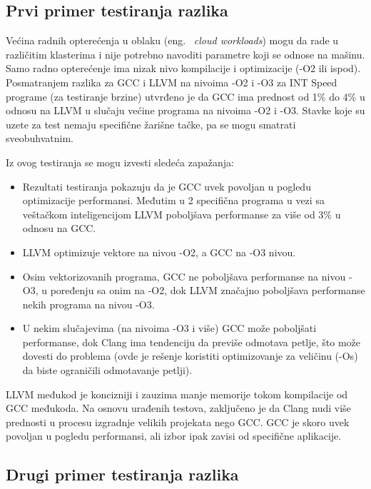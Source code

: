 \documentclass[a4paper]{article}
\begin{document}
\subsection{Prvi primer testiranja razlika}
\label{subsec:primer1}
Većina radnih opterećenja u oblaku (eng. ~{\em cloud workloads}) mogu da rade u različitim klasterima i nije potrebno navoditi parametre koji se odnose na mašinu. 
Samo radno opterećenje ima nizak nivo kompilacije i optimizacije (-O2 ili ispod).
Posmatranjem razlika za GCC i LLVM na nivoima -O2 i -O3 za INT Speed programe (za testiranje brzine) utvrđeno je da 
GCC ima prednost od 1\% do 4\% u odnosu na LLVM u slučaju većine programa na nivoima -O2 i -O3. 
Stavke koje su uzete za test nemaju specifične žarišne tačke, pa se mogu smatrati sveobuhvatnim.

Iz ovog testiranja se mogu izvesti sledeća zapažanja: 

\begin{itemize} 
\item Rezultati testiranja pokazuju da je GCC uvek povoljan u pogledu optimizacije performansi. 
Međutim u 2 specifična programa u vezi sa veštačkom inteligencijom LLVM poboljšava performanse za više od 3\% u odnosu na GCC. 
\item LLVM optimizuje vektore na nivou -O2,  a GCC na -O3 nivou. 
\item Osim vektorizovanih programa, GCC ne poboljšava performanse na nivou -O3, u poređenju sa onim na -O2, dok LLVM značajno poboljšava performanse nekih programa na nivou -O3. 
\item U nekim slučajevima (na nivoima -O3 i više) GCC može poboljšati performanse, dok Clang ima tendenciju da previše odmotava petlje, što može dovesti do problema (ovde je rešenje koristiti optimizovanje za veličinu (-Os) da biste ograničili odmotavanje petlji).
\end{itemize}

LLVM međukod je koncizniji i zauzima manje memorije tokom kompilacije od GCC međukoda.
Na osnovu urađenih testova, zaključeno je da Clang nudi više prednosti u procesu izgradnje velikih projekata nego GCC. 
GCC je skoro uvek povoljan u pogledu performansi, ali izbor ipak zavisi od specifične aplikacije. \cite{gccVsClang} 

\subsection{Drugi primer testiranja razlika}
\label{subsec:primer1}
\end{document}
